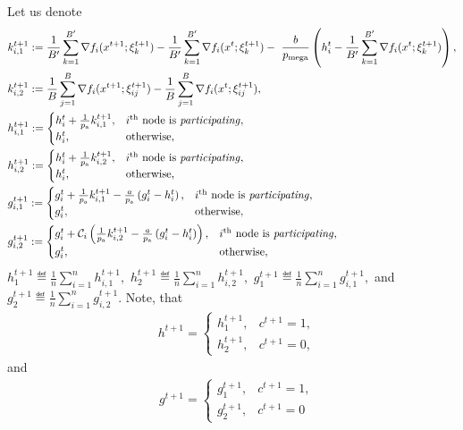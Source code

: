 \documentclass{article}
\newcommand*{\probavailable}{\ensuremath{p_{\textnormal{a}}}}
\newcommand*{\probmega}{\ensuremath{p_{\text{mega}}}}
\begin{document}
Let us denote
\begin{align*}
    &k^{t+1}_{i, 1} \eqdef \frac{1}{B'} \sum_{k=1}^{B'} \nabla f_i(x^{t+1};\xi_{k}^{t+1}) - \frac{1}{B'} \sum_{k=1}^{B'} \nabla f_i(x^{t};\xi_{k}^{t+1})-~\frac{b}{\probmega}\left(h^t_i - \frac{1}{B'} \sum_{k=1}^{B'} \nabla f_i(x^{t};\xi_{k}^{t+1})\right), \\
    &k^{t+1}_{i, 2} \eqdef \frac{1}{B} \sum_{j=1}^{B}\nabla f_i(x^{t+1};\xi^{t+1}_{ij}) - \frac{1}{B} \sum_{j=1}^{B}\nabla f_i(x^{t};\xi^{t+1}_{ij}), \\
    &h^{t+1}_{i,1} \eqdef \begin{cases}
        h^t_i + \frac{1}{\probavailable} k^{t+1}_{i, 1},& i^{\textnormal{th}} \textnormal{ node is \textit{participating}}, \\
        h^t_i, & \textnormal{otherwise},
    \end{cases}  \\
    &h^{t+1}_{i,2} \eqdef \begin{cases}
        h^t_i + \frac{1}{\probavailable} k^{t+1}_{i, 2},& i^{\textnormal{th}} \textnormal{ node is \textit{participating}}, \\
        h^t_i, & \textnormal{otherwise},
    \end{cases}  \\
    &g^{t+1}_{i,1} \eqdef \begin{cases}
      g^{t}_i + \frac{1}{\probavailable}k^{t+1}_{i, 1} - \frac{a}{\probavailable} \left(g^t_i - h^t_i\right),& i^{\textnormal{th}} \textnormal{ node is \textit{participating}}, \\
      g^t_i, & \textnormal{otherwise},
    \end{cases}  \\
    &g^{t+1}_{i,2} \eqdef \begin{cases}
        g^t_i + \cC_i\left(\frac{1}{\probavailable}k^{t+1}_{i, 2} - \frac{a}{\probavailable} \left(g^t_i - h^{t}_i\right)\right),& i^{\textnormal{th}} \textnormal{ node is \textit{participating}}, \\
        g^t_i, & \textnormal{otherwise},
    \end{cases}  \\
\end{align*}
$h^{t+1}_{1} \eqdef \frac{1}{n}\sum_{i=1}^n h^{t+1}_{i,1},$ $h^{t+1}_{2} \eqdef \frac{1}{n}\sum_{i=1}^n h^{t+1}_{i,2},$ $g^{t+1}_{1} \eqdef \frac{1}{n}\sum_{i=1}^n g^{t+1}_{i,1},$ and $g^{t+1}_{2} \eqdef \frac{1}{n}\sum_{i=1}^n g^{t+1}_{i,2}.$ Note, that
\begin{align*}
  &h^{t+1} = \begin{cases}
    h^{t+1}_{1},& c^{t+1} = 1, \\
    h^{t+1}_{2},& c^{t+1} = 0,
\end{cases}
\end{align*}
and
\begin{align*}
  &g^{t+1} = \begin{cases}
    g^{t+1}_{1},& c^{t+1} = 1, \\
    g^{t+1}_{2},& c^{t+1} = 0 
\end{cases}
\end{align*}
\end{document}
